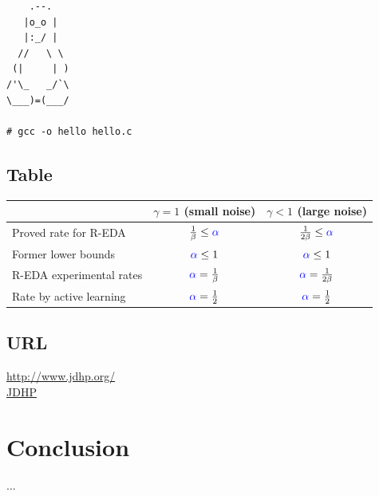 \documentclass{article}
\begin{document}
\begin{verbatim}
    .--.
   |o_o |
   |:_/ |
  //   \ \
 (|     | )
/'\_   _/`\
\___)=(___/

# gcc -o hello hello.c
\end{verbatim}


\subsection{Table}\label{subsec:table}

\begin{tabular}{|l|c|c|}
\hline
                          & $\gamma=1$ (small noise)                      & $\gamma<1$ (large noise) \\
\hline
Proved rate for R-EDA     & $\frac{1}{\beta} \leq {\color{blue} \alpha}$  & $\frac{1}{2\beta} \leq {\color{blue} \alpha}$ \\
\hline
Former lower bounds       & ${\color{blue} \alpha} \leq 1$                & ${\color{blue} \alpha} \leq 1$ \\
\hline
R-EDA experimental rates  & ${\color{blue} \alpha} = \frac{1}{\beta}$     & ${\color{blue} \alpha} = \frac{1}{2\beta}$ \\
\hline
\hline
Rate by active learning   & ${\color{blue} \alpha} = \frac{1}{2}$        & ${\color{blue} \alpha} = \frac{1}{2}$   \\
\hline
\end{tabular}


\subsection{URL}\label{subsec:url}

\url{http://www.jdhp.org/}  \\
\href{http://www.jdhp.org/}{JDHP}



\section*{Conclusion}\label{sec:ccl}
 
...



\end{document}
